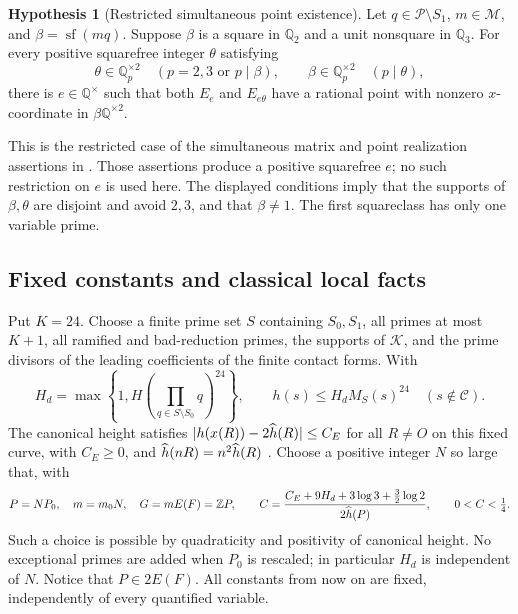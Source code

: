 \documentclass[11pt]{article}
\theoremstyle{definition}\newtheorem{inputthm}[theorem]{Hypothesis}
\theoremstyle{remark}\newtheorem{remark}[theorem]{Remark}
\newcommand{\Q}{\mathbb Q}\newcommand{\Z}{\mathbb Z}
\newcommand{\C}{\mathcal C}\newcommand{\Supp}{\operatorname{Supp}}
\begin{document}
\begin{inputthm}[Restricted simultaneous point existence]
\label{in:restricted-realization}
Let $q\in\mathscr P\setminus S_1$, $m\in\mathcal M$, and
$\beta=\operatorname{sf}(mq)$. Suppose $\beta$ is a square in
$\Q_2$ and a unit nonsquare in $\Q_3$. For every positive squarefree
integer $\theta$ satisfying
\[
 \theta\in\Q_p^{\times2}\quad(p=2,3\text{ or }p\mid\beta),
 \qquad
 \beta\in\Q_p^{\times2}\quad(p\mid\theta),
\]
there is $e\in\Q^\times$ such that both $E_e$ and $E_{e\theta}$
have a rational point with nonzero $x$-coordinate in
$\beta\Q^{\times2}$.
\end{inputthm}

This is the restricted case of the simultaneous matrix and point
realization assertions in \cite[Lemmas~3.2, 3.4, 3.6]{H10}.
Those assertions produce a positive squarefree $e$; no such restriction
on $e$ is used here. The displayed conditions imply that the supports
of $\beta,\theta$ are disjoint and avoid $2,3$, and that
$\beta\ne1$. The first squareclass has only one variable prime.



\subsection{Fixed constants and classical local facts}

Put $K=24$. Choose a finite prime set $S$ containing $S_0,S_1$,
all primes at most $K+1$, all ramified and bad-reduction primes,
the supports of $\mathcal K$, and the prime divisors of the leading
coefficients of the finite contact forms. With
\[
 H_d=\max\left\{1,H\left(\prod_{q\in S\setminus S_0}q\right)^{24}\right\},
 \qquad h(s)\le H_dM_S(s)^{24}\quad(s\notin\C).
\]
The canonical height satisfies
$|h(x(R))-2\widehat h(R)|\le C_E$ for all $R\ne O$ on this fixed curve,
with $C_E\ge0$, and $\widehat h(nR)=n^2\widehat h(R)$
\cite[Theorem~VIII.9.3(b),(d),(e)]{Silverman}.
Choose a positive integer $N$ so large that, with
\begin{equation}\label{eq:small-C}
 P=NP_0,\quad m=m_0N,\quad G=mE(F)=\Z P,\qquad
 C=\frac{C_E+9H_d+3\log3+\tfrac32\log2}{2\hhat(P)},
 \qquad 0<C<\tfrac14.
\end{equation}
Such a choice is possible by quadraticity and positivity of canonical
height. No exceptional primes are added when $P_0$ is rescaled;
in particular $H_d$ is independent of $N$. Notice that $P\in2E(F)$.
All constants from now on are fixed, independently of every quantified
variable.
\end{document}
